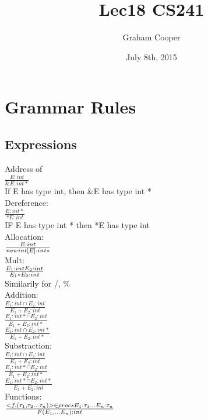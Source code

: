 \documentclass[12pt]{article}
\title{\vspace{-15ex}Lec18 CS241\vspace{-1ex}}
\date{July 8th, 2015}
\author{Graham Cooper}
\begin{document}
	\maketitle
	
	\section*{Grammar Rules}
	\subsection*{Expressions}
	Address of\\
	$\frac{E: int}{\&E : int *}$\\
	If E has type int, then \&E has type int *\\
	
	Dereference:\\
	$\frac{E: int *}{*E : int}$\\
	IF E has type int * then *E has type int\\
	
	Allocation:\\
	$\frac{E:\space int}{new int[E] : int *}$\\
	
	Mult:\\
	$\frac{E_1 :\space int\space E_2 : int}{E_1 * E_2 : int}$\\
	Similarily for /, \%\\
	
	Addition:\\
	$\frac{E_1: int \cap E_2:int}{E_1 + E_2 : int}$\\
	
	$\frac{E_1: int * \cap E_2:int}{E_1 + E_2 : int *}$\\
	
	$\frac{E_1: int \cap E_2:int *}{E_1 + E_2 : int *}$\\
	
	Substraction:\\
	$\frac{E_1: int \cap E_2:int}{E_1 + E_2 : int}$\\
	
	$\frac{E_1: int * \cap E_2:int}{E_1 + E_2 : int *}$\\
	
	$\frac{E_1: int * \cap E_2:int *}{E_1 + E_2 : int}$\\
	
	Functions:\\
	$\frac{<f,(\tau_1,\tau_2...\tau_n)> \in procs \space E_1: \tau_1 ... E_n: \tau_n}{F(E_1,...E_n): int}$\\
	
\end{document}
